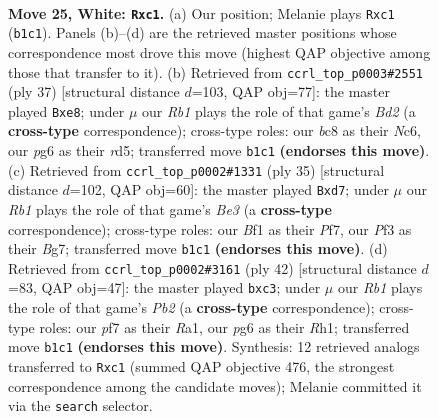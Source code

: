 \documentclass[11pt]{article}
\begin{document}
\clearpage

\begin{figure}[p]\centering
\begin{subfigure}{0.46\textwidth}\centering
\resizebox{\linewidth}{!}{%
\newchessgame
\chessboard[
  setfen={r1b2kr1/1p2bp1p/p5p1/2Bp4/8/3K1PN1/PP4PP/1Rq2B1R w - - 0 25},
  showmover=false,
  pgfstyle=straightmove, color=movearrow, markmove={b1-c1}
]}
\caption{}
\end{subfigure}\hfill
\begin{subfigure}{0.46\textwidth}\centering
\resizebox{\linewidth}{!}{%
\newchessgame
\chessboard[
  setfen={2r1Qrk1/1p1b1pp1/p1n4p/3R4/PbB5/5NBP/1P3PP1/R5K1 b - - 0 19},
  showmover=false,
  pgfstyle=straightmove, color=movearrow, markmove={d7-e8}
]}
\caption{}
\end{subfigure}
\\[4pt]
\begin{subfigure}{0.46\textwidth}\centering
\resizebox{\linewidth}{!}{%
\newchessgame
\chessboard[
  setfen={r3r1k1/2pQ1pbp/p3b1p1/4p3/2P1P3/4B1P1/PP3PB1/R3R1K1 b - - 0 18},
  showmover=false,
  pgfstyle=straightmove, color=movearrow, markmove={e6-d7}
]}
\caption{}
\end{subfigure}\hfill
\begin{subfigure}{0.46\textwidth}\centering
\resizebox{\linewidth}{!}{%
\newchessgame
\chessboard[
  setfen={r5k1/pppr1p2/4b1p1/2P5/4P3/P1qB4/1P1N1PP1/R3K2R w KQ - 0 22},
  showmover=false,
  pgfstyle=straightmove, color=movearrow, markmove={b2-c3}
]}
\caption{}
\end{subfigure}
\caption{\textbf{Move 25, White: \texttt{Rxc1}.} (a) Our position; Melanie plays \texttt{Rxc1} (\texttt{b1c1}). Panels (b)--(d) are the retrieved master positions whose correspondence most drove this move (highest QAP objective among those that transfer to it). (b) Retrieved from \texttt{ccrl\_top\_p0003\#2551} (ply 37) [structural distance $d$=103, QAP obj=77]: the master played \texttt{Bxe8}; under $\mu$ our \emph{Rb1} plays the role of that game's \emph{Bd2} (a \textbf{cross-type} correspondence); cross-type roles: our \emph{b}c8 as their \emph{N}c6, our \emph{p}g6 as their \emph{r}d5; transferred move \texttt{b1c1} \textbf{(endorses this move)}. (c) Retrieved from \texttt{ccrl\_top\_p0002\#1331} (ply 35) [structural distance $d$=102, QAP obj=60]: the master played \texttt{Bxd7}; under $\mu$ our \emph{Rb1} plays the role of that game's \emph{Be3} (a \textbf{cross-type} correspondence); cross-type roles: our \emph{B}f1 as their \emph{P}f7, our \emph{P}f3 as their \emph{B}g7; transferred move \texttt{b1c1} \textbf{(endorses this move)}. (d) Retrieved from \texttt{ccrl\_top\_p0002\#3161} (ply 42) [structural distance $d$=83, QAP obj=47]: the master played \texttt{bxc3}; under $\mu$ our \emph{Rb1} plays the role of that game's \emph{Pb2} (a \textbf{cross-type} correspondence); cross-type roles: our \emph{p}f7 as their \emph{R}a1, our \emph{p}g6 as their \emph{R}h1; transferred move \texttt{b1c1} \textbf{(endorses this move)}. Synthesis: 12 retrieved analogs transferred to \texttt{Rxc1} (summed QAP objective 476, the strongest correspondence among the candidate moves); Melanie committed it via the \texttt{search} selector.}
\label{fig:thought-m48}
\end{figure}
\end{document}
